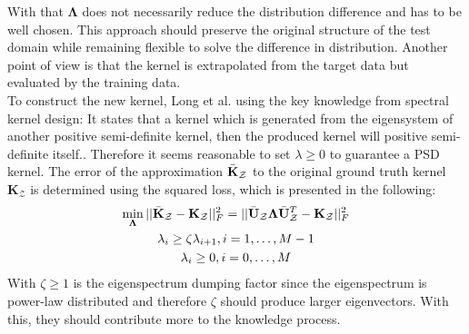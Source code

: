 With that $\boldsymbol{\Lambda}$ does not necessarily reduce the distribution difference and has to be well chosen.
This approach should preserve the original structure of the test domain while remaining flexible to solve the difference in distribution.
Another point of view is that the kernel is extrapolated from the target data but evaluated by the training data.\cite{Long.2015}\\
To construct the new kernel, Long et al. using the key knowledge from spectral kernel design:
It states that a kernel which is generated from the eigensystem of another positive semi-definite kernel, then the produced kernel will positive semi-definite itself.\cite{KaiZhang.2013}.
Therefore it seems reasonable to set $\lambda \ge 0$ to guarantee a \acs{PSD} kernel.
The error of the approximation $\bar{\mathbf{K}}_\mathcal{Z}$ to the original ground truth kernel $\mathbf{K}_\mathcal{Z}$ is determined using the squared loss, which is presented in the following:\cite{Long.2015}
\begin{equation}\label{EqTKLSquareErrorLoss}
	\begin{gathered}
		\min_{\boldsymbol{\Lambda}} || \bar{\mathbf{K}}_\mathcal{Z} - \mathbf{K}_\mathcal{Z}||^2_F = || \bar{\mathbf{U}}_\mathcal{Z} \boldsymbol{\Lambda}  \bar{\mathbf{U}}_\mathcal{Z}^T - \mathbf{K}_\mathcal{Z} ||^2_F \\
		\lambda_i \ge \zeta \lambda_{i+1}, i = 1,\dots,M-1 \\
		\lambda_i \ge 0,  i = 0,\dots,M
	\end{gathered}
\end{equation}
With $\zeta \ge 1$ is the eigenspectrum dumping factor since the eigenspectrum is power-law distributed and therefore $\zeta$ should produce larger eigenvectors.
With this, they should contribute more to the knowledge process.\cite{Long.2015}
